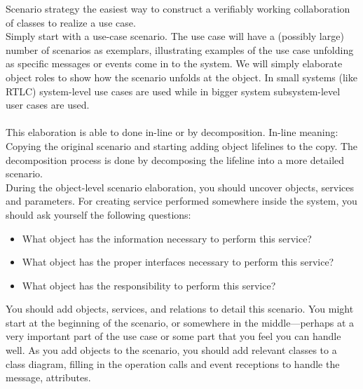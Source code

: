 \documentclass[12pt,a4paper]{article}
\begin{document}
Scenario strategy the easiest way to construct a verifiably working
collaboration of classes to realize a use case. \\ Simply start with a use-case scenario. The use case will have a (possibly large) number
of scenarios as exemplars, illustrating examples of the use case unfolding as specific messages or events come in to the system. We will simply
elaborate object roles to show how the scenario unfolds at the object. In small systems (like RTLC) system-level use cases are used while in bigger system subsystem-level user cases are used. \\ \\
This elaboration is able to done in-line or by decomposition. In-line meaning: 
Copying the original scenario and starting adding object lifelines to the copy. The decomposition process is done by decomposing the lifeline into a more detailed scenario. 
\\
During the object-level scenario elaboration, you should uncover objects, services and parameters.
For creating service performed somewhere inside the system, you should ask yourself the following questions:
\begin{itemize}
\item What object has the information necessary to perform this service?
\item What object has the proper interfaces necessary to perform this service?
\item What object has the responsibility to perform this service?
\end{itemize}


You should add objects, services, and relations to detail this scenario. You might start at the beginning of the scenario, or somewhere in the middle—perhaps at a very important part of the use case or some part that you feel you can handle well. As you add objects to the scenario, you should add relevant classes to a class diagram, filling in the operation calls and event receptions to handle the message, attributes.
\end{document}
